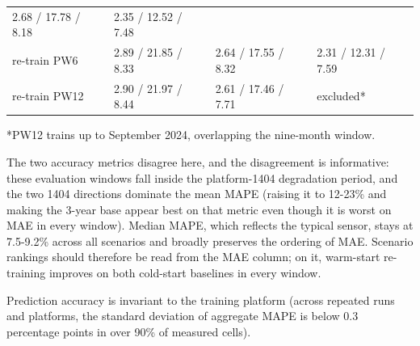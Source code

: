 \documentclass[
  10pt, ]{article}
\begin{document}
\begin{longtable}[]{@{}llll@{}}
\begin{minipage}[t]{0.22\columnwidth}
2.68 / 17.78 / 8.18\strut
\end{minipage} & \begin{minipage}[t]{0.22\columnwidth}\raggedright
2.35 / 12.52 / 7.48\strut
\end{minipage}\tabularnewline
\begin{minipage}[t]{0.22\columnwidth}\raggedright
re-train PW6\strut
\end{minipage} & \begin{minipage}[t]{0.22\columnwidth}\raggedright
2.89 / 21.85 / 8.33\strut
\end{minipage} & \begin{minipage}[t]{0.22\columnwidth}\raggedright
2.64 / 17.55 / 8.32\strut
\end{minipage} & \begin{minipage}[t]{0.22\columnwidth}\raggedright
2.31 / 12.31 / 7.59\strut
\end{minipage}\tabularnewline
\begin{minipage}[t]{0.22\columnwidth}\raggedright
re-train PW12\strut
\end{minipage} & \begin{minipage}[t]{0.22\columnwidth}\raggedright
2.90 / 21.97 / 8.44\strut
\end{minipage} & \begin{minipage}[t]{0.22\columnwidth}\raggedright
2.61 / 17.46 / 7.71\strut
\end{minipage} & \begin{minipage}[t]{0.22\columnwidth}\raggedright
excluded*\strut
\end{minipage}\tabularnewline
\bottomrule
\end{longtable}

*PW12 trains up to September 2024, overlapping the nine-month window.

The two accuracy metrics disagree here, and the disagreement is informative: these evaluation windows fall inside the platform-1404 degradation period, and the two 1404 directions dominate the mean MAPE (raising it to 12-23\% and making the 3-year base appear best on that metric even though it is worst on MAE in every window). Median MAPE, which reflects the typical sensor, stays at 7.5-9.2\% across all scenarios and broadly preserves the ordering of MAE. Scenario rankings should therefore be read from the MAE column; on it, warm-start re-training improves on both cold-start baselines in every window.

Prediction accuracy is invariant to the training platform (across repeated runs and platforms, the standard deviation of aggregate MAPE is below 0.3 percentage points in over 90\% of measured cells).
\end{document}
